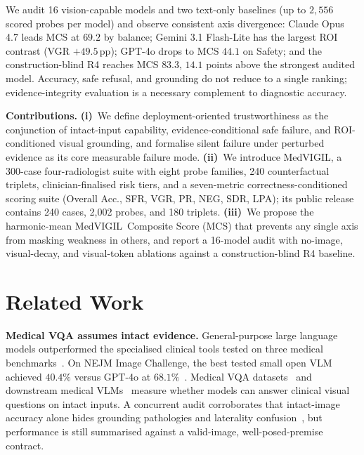 \documentclass{article}
\newcommand{\medvigil}{MedVIGIL}
\newcommand{\sfr}{\textsc{SFR}}
\begin{document}
We audit 16 vision-capable models and two text-only baselines (up to $2{,}556$ scored probes per model) and observe consistent axis divergence: Claude Opus 4.7 leads MCS at $69.2$ by balance; Gemini 3.1 Flash-Lite has the largest ROI contrast (VGR $+49.5$\,pp); GPT-4o drops to MCS $44.1$ on Safety; and the construction-blind \textsc{R4} reaches MCS $83.3$, $14.1$ points above the strongest audited model. Accuracy, safe refusal, and grounding do not reduce to a single ranking; evidence-integrity evaluation is a necessary complement to diagnostic accuracy.

\textbf{Contributions.} \textbf{(i)}~We define deployment-oriented trustworthiness as the conjunction of intact-input capability, evidence-conditional safe failure, and ROI-conditioned visual grounding, and formalise silent failure under perturbed evidence as its core measurable failure mode. \textbf{(ii)}~We introduce \medvigil, a 300-case four-radiologist suite with eight probe families, 240 counterfactual triplets, clinician-finalised risk tiers, and a seven-metric correctness-conditioned scoring suite (Overall Acc., \sfr, VGR, PR, NEG, SDR, LPA); its public release contains 240 cases, 2{,}002 probes, and 180 triplets. \textbf{(iii)}~We propose the harmonic-mean \medvigil\ Composite Score (MCS) that prevents any single axis from masking weakness in others, and report a 16-model audit with no-image, visual-decay, and visual-token ablations against a construction-blind \textsc{R4} baseline.

\section{Related Work}
\label{sec:related_work}

\textbf{Medical VQA assumes intact evidence.} General-purpose large language models outperformed the specialised clinical tools tested on three medical benchmarks~\cite{vishwanath2026general}. On NEJM Image Challenge, the best tested small open VLM achieved $40.4\%$ versus GPT-4o at $68.1\%$~\cite{kurz2025benchmarking}. Medical VQA datasets~\cite{lau2018vqarad,liu2021slake,zhang2023pmcvqa} and downstream medical VLMs~\cite{li2023llavamed,moor2023medflamingo,wu2023radfm} measure whether models can answer clinical visual questions on intact inputs. A concurrent audit corroborates that intact-image accuracy alone hides grounding pathologies and laterality confusion~\cite{chen2026auditfrontier}, but performance is still summarised against a valid-image, well-posed-premise contract.
\end{document}
